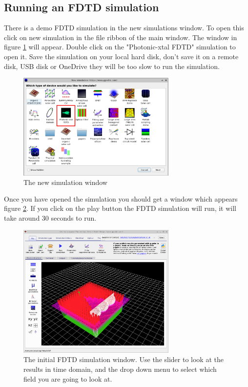 \subsection{Running an FDTD simulation}
There is a demo FDTD simulation in the new simulations window. To open this click on new simulation in the file ribbon of the main window. The window in figure \ref{fig:fdtdnewdemo} will appear. Double click on the "Photonic-xtal FDTD" simulation to open it.  Save the simulation on your local hard disk, don't save it on a remote disk, USB disk or OneDrive they will be too slow to run the simulation.

\begin{figure}[H]
\centering
\includegraphics[width=0.7\textwidth]{./images/fdtd_1.png}
\caption{The new simulation window}
\label{fig:fdtdnewdemo}
\end{figure}

Once you have opened the simulation you should get a window which appears figure \ref{fig:fdtdfirstwindow}. If you click on the play button the FDTD simulation will run, it will take around 30 seconds to run.

\begin{figure}[H]
\centering
\includegraphics[width=0.7\textwidth]{./images/fdtd_2.png}
\caption{The initial FDTD simulation window. Use the slider to look at the results in time domain, and the drop down menu to select which field you are going to look at.}
\label{fig:fdtdfirstwindow}
\end{figure}

